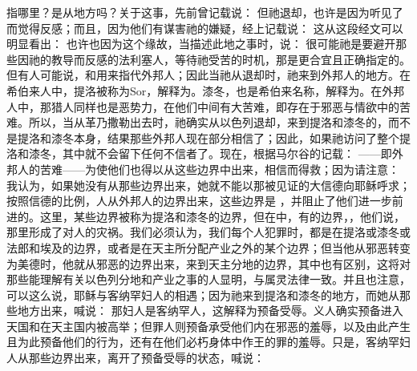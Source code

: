   指哪里？是从地方吗？关于这事，先前曾记载说：  但祂退却，也许是因为听见了  而觉得反感；而且，因为他们有谋害祂的嫌疑，经上记载说： 这从这段经文可以明显看出：  也许也因为这个缘故，当描述此地之事时，说：  很可能祂是要避开那些因祂的教导而反感的法利塞人，等待祂受苦的时机，那是更合宜且正确指定的。但有人可能说，和用来指代外邦人；因此当祂从退却时，祂来到外邦人的地方。在希伯来人中，提洛被称为Sor，解释为。漆冬，也是希伯来名称，解释为。在外邦人中，那猎人同样也是恶势力，在他们中间有大苦难，即存在于邪恶与情欲中的苦难。所以，当从革乃撒勒出去时，祂确实从以色列退却，来到提洛和漆冬的，而不是提洛和漆冬本身，结果那些外邦人现在部分相信了；因此，如果祂访问了整个提洛和漆冬，其中就不会留下任何不信者了。现在，根据马尔谷的记载： ——即外邦人的苦难——为使他们也得以从这些边界中出来，相信而得救；因为请注意：  我认为，如果她没有从那些边界出来，她就不能以那被见证的大信德向耶稣呼求；按照信德的比例，人从外邦人的边界出来，这些边界是 ，并阻止了他们进一步前进的。这里，某些边界被称为提洛和漆冬的边界，但在中，有的边界，，他们说，那里形成了对人的灾祸。我们必须认为，我们每个人犯罪时，都是在提洛或漆冬或法郎和埃及的边界，或者是在天主所分配产业之外的某个边界；但当他从邪恶转变为美德时，他就从邪恶的边界出来，来到天主分地的边界，其中也有区别，这将对那些能理解有关以色列分地和产业之事的人显明，与属灵法律一致。并且也注意，可以这么说，耶稣与客纳罕妇人的相遇；因为祂来到提洛和漆冬的地方，而她从那些地方出来，喊说：  那妇人是客纳罕人，这解释为预备受辱。义人确实预备进入天国和在天主国内被高举；但罪人则预备承受他们内在邪恶的羞辱，以及由此产生且为此预备他们的行为，还有在他们必朽身体中作王的罪的羞辱。只是，客纳罕妇人从那些边界出来，离开了预备受辱的状态，喊说：\par

